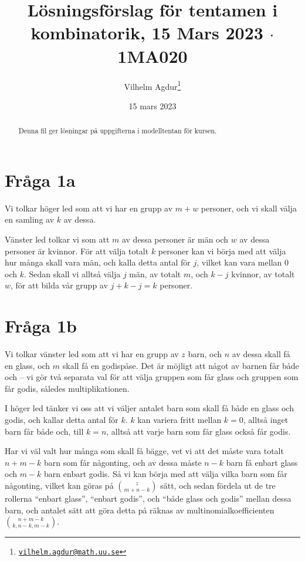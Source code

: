 \documentclass[nobib]{tufte-handout}
\title{Lösningsförslag för tentamen i kombinatorik, 15 Mars 2023 $\cdot$ 1MA020}
\author[Vilhelm Agdur]{Vilhelm Agdur\thanks{\href{mailto:vilhelm.agdur@math.uu.se}{\nolinkurl{vilhelm.agdur@math.uu.se}}}}
\date{15 mars 2023}
\begin{document}

\maketitle%

\begin{abstract}
\noindent

Denna fil ger lösningar på uppgifterna i modelltentan för kursen.
\end{abstract}

\section{Fråga 1a}

Vi tolkar höger led som att vi har en grupp av $m + w$ personer, och vi skall välja en samling av $k$ av dessa.

Vänster led tolkar vi som att $m$ av dessa personer är män och $w$ av dessa personer är kvinnor. För att välja totalt $k$ personer kan vi börja med att välja hur många skall vara män, och kalla detta antal för $j$, vilket kan vara mellan $0$ och $k$. Sedan skall vi alltså välja $j$ män, av totalt $m$, och $k - j$ kvinnor, av totalt $w$, för att bilda vår grupp av $j + k - j = k$ personer.

\section{Fråga 1b}

Vi tolkar vänster led som att vi har en grupp av $z$ barn, och $n$ av dessa skall få en glass, och $m$ skall få en godispåse. Det är möjligt att något av barnen får både och -- vi gör två separata val för att välja gruppen som får glass och gruppen som får godis, således multiplikationen.

I höger led tänker vi oss att vi väljer antalet barn som skall få både en glass och godis, och kallar detta antal för $k$. $k$ kan variera fritt mellan $k = 0$, alltså inget barn får både och, till $k = n$, alltså att varje barn som får glass också får godis.

Har vi väl valt hur många som skall få bägge, vet vi att det måste vara totalt $n + m - k$ barn som får någonting, och av dessa måste $n - k$ barn få enbart glass och $m - k$ barn enbart godis. Så vi kan börja med att välja vilka barn som får någonting, vilket kan göras på $\binom{z}{m + n - k}$ sätt, och sedan fördela ut de tre rollerna ``enbart glass'', ``enbart godis'', och ``både glass och godis'' mellan dessa barn, och antalet sätt att göra detta på räknas av multinomialkoefficienten $\binom{n + m - k}{k, n-k, m-k}$.

%
%
\end{document}
